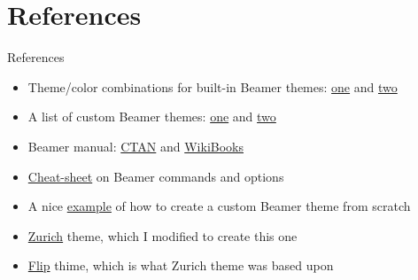 \documentclass[11pt,c]{beamer}
\begin{document}
\section{References}
	\begin{frame}{References}
		\begin{itemize} \justifying
			\item
				Theme/color combinations for built-in Beamer themes: \href{https://mpetroff.net/files/beamer-theme-matrix/}{one} and \href{http://deic.uab.es/~iblanes/beamer_gallery/}{two}
			\item
				A list of custom Beamer themes: \href{https://latex.simon04.net/}{one} and \href{https://github.com/martinbjeldbak/ultimate-beamer-theme-list}{two}
			\item
				Beamer manual: \href{http://tug.ctan.org/macros/latex/contrib/beamer/doc/beameruserguide.pdf}{CTAN} and \href{https://en.wikibooks.org/wiki/LaTeX/Presentations}{WikiBooks}
			\item
				\href{http://www.cpt.univ-mrs.fr/~masson/latex/Beamer-appearance-cheat-sheet.pdf}{Cheat-sheet} on Beamer commands and options
			\item
				A nice \href{https://tex.stackexchange.com/questions/146529/design-a-custom-beamer-theme-from-scratch}{example} of how to create a custom Beamer theme from scratch
			\item
				\href{https://github.com/ppletscher/beamerthemezurich}{Zurich} theme, which I modified to create this one
			\item
				\href{https://github.com/fliptanedo/FlipBeamerTheme}{Flip} thime, which is what Zurich theme was based upon
		\end{itemize}
	\end{frame}
\end{document}
